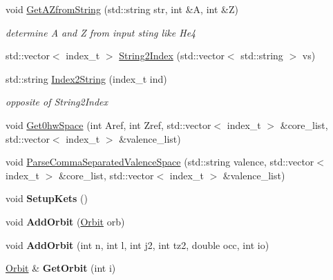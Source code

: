 \begin{DoxyCompactItemize}
void \hyperlink{classModelSpace_a2370ffd4ec2d8e63db3a72b4a43784db}{Get\+A\+Zfrom\+String} (std\+::string str, int \&A, int \&Z)
\begin{DoxyCompactList}\small\item\em determine A and Z from input sting like \textquotesingle{}He4\textquotesingle{} \end{DoxyCompactList}\item 
std\+::vector$<$ index\+\_\+t $>$ \hyperlink{classModelSpace_a11ac7aee125fb0a97cd3f1394c4cdb8f}{String2\+Index} (std\+::vector$<$ std\+::string $>$ vs)
\item 
\mbox{\label{classModelSpace_ac22b0378c0775c58268238317b5389ee}} 
std\+::string \hyperlink{classModelSpace_ac22b0378c0775c58268238317b5389ee}{Index2\+String} (index\+\_\+t ind)
\begin{DoxyCompactList}\small\item\em opposite of String2\+Index \end{DoxyCompactList}\item 
void \hyperlink{classModelSpace_ac572395f9cb05967fba8075328da8da3}{Get0hw\+Space} (int Aref, int Zref, std\+::vector$<$ index\+\_\+t $>$ \&core\+\_\+list, std\+::vector$<$ index\+\_\+t $>$ \&valence\+\_\+list)
\item 
void \hyperlink{classModelSpace_a3a73226c5f32007c36d6f193b353644d}{Parse\+Comma\+Separated\+Valence\+Space} (std\+::string valence, std\+::vector$<$ index\+\_\+t $>$ \&core\+\_\+list, std\+::vector$<$ index\+\_\+t $>$ \&valence\+\_\+list)
\item 
\mbox{\label{classModelSpace_ae1a3578ed5aabec2956998a870a4e2d2}} 
void {\bfseries Setup\+Kets} ()
\item 
\mbox{\label{classModelSpace_ad8acc2ca5b475862101595d911987a7e}} 
void {\bfseries Add\+Orbit} (\hyperlink{classOrbit}{Orbit} orb)
\item 
\mbox{\label{classModelSpace_a8bc32511dc8b05203c6352343a539a57}} 
void {\bfseries Add\+Orbit} (int n, int l, int j2, int tz2, double occ, int io)
\item 
\mbox{\label{classModelSpace_a9a958612b1dcf52caf0bf16539026bb4}} 
\hyperlink{classOrbit}{Orbit} \& {\bfseries Get\+Orbit} (int i)
\item 

\end{DoxyCompactItemize}
